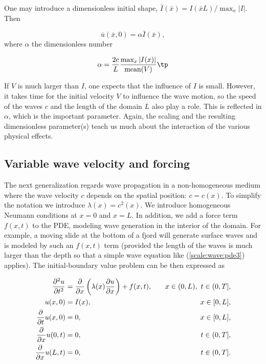 \documentclass[graybox,envcountchap,sectrefs,final]{svmonodo}
\begin{document}
One may introduce a dimensionless initial
shape, $\bar I (\bar x)= I(\bar xL)/\max_x |I|$. Then

\[ \bar u(\bar x, 0) = \alpha\bar I(\bar x),\]
where $\alpha$ the dimensionless number

\[ \alpha = \frac{2c}{L}\frac{\max_x |I(x)|}{\hbox{mean}(V)}\tp\]


If $V$ is much larger than $I$, one expects that the influence of $I$
is small. However, it takes time for the initial velocity $V$ to
influence the wave motion, so the speed of the waves $c$ and the length
of the domain $L$ also play a role. This is reflected in $\alpha$, which is the
important parameter.
Again, the scaling and the resulting dimensionless parameter(s)
teach us much about the interaction of the various physical effects.


\subsection{Variable wave velocity and forcing}
\label{scale:wave:pde2:cvar}

The next generalization regards wave propagation in
a non-homogeneous medium where the wave velocity $c$ depends on the
spatial position: $c=c(x)$. To simplify the notation we introduce
$\lambda (x) = c^2(x)$. We introduce homogeneous Neumann conditions
at $x=0$ and $x=L$. In addition, we add a force term $f(x,t)$
to the PDE, modeling wave generation in the interior of
the domain. For example, a moving slide at the bottom of a fjord
will generate surface waves and is modeled by such an $f(x,t)$ term
(provided the length of the waves is much larger than the depth so
that a simple wave equation like (\ref{scale:wave:pde3}) applies).
The initial-boundary value problem
can be then expressed as

\begin{align}
\frac{\partial^2 u}{\partial t^2} &=
\frac{\partial}{\partial x}\left(
\lambda(x) {\partial u\over\partial x}\right) + f(x,t),
\quad & x\in (0,L),\ t\in (0,T],
\label{scale:wave:pde3}\\ 
u(x,0) &= I(x),
\quad &x\in [0,L],
\label{scale:wave:pde3:ic:u}\\ 
{\partial\over\partial t}u(x,0) &= 0,
\quad & x\in [0,L],
\label{scale:wave:pde3:ic:ut}\\ 
\frac{\partial}{\partial x}u(0,t) & = 0,
\quad  &t\in (0,T],
\label{scale:wave:pde3:bc:0}\\ 
\frac{\partial}{\partial x}u(L,t) & = 0,
\quad  &t\in (0,T].
\label{scale:wave:pde3:bc:L}
\end{align}
\end{document}
